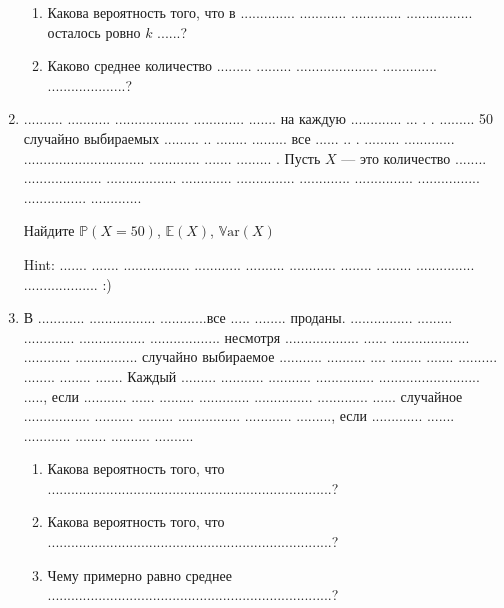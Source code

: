 \documentclass[12pt,a4paper]{article}
\def \P{\mathbb{P}}
\def \Var{\mathbb{V}\mathrm{ar}}
\def \E{\mathbb{E}}
\begin{document}
\begin{enumerate}
\begin{enumerate}
\item Какова вероятность того, что в .............. ............ .............  ................. осталось ровно $k$ ......?
\item Каково среднее количество ......... ......... .....................  .............. ....................?
\end{enumerate}

\item  .......... ........... ................... ............. ....... на каждую .............  ... . . ......... 50 случайно выбираемых ......... .. ........ ......... все ...... .. . ......... ............. ............................... ............. ....... ......... . Пусть $X$ --- это количество ........ .................... .................. ............. ............... ............. ............... ................ ................ .............

Найдите $\P(X=50)$, $\E(X)$, $\Var(X)$

Hint:  ....... ....... ................. ............ ..........  ............ ........ ......... ............... ................... :)


\item В ............  ................. ............все ..... ........ проданы.  ................ ......... ............. ................. .................. несмотря ...................  ...... .................... ............ ................ случайно выбираемое ........... .......... .... ........ ....... .......... ........ ........ ....... Каждый ......... ........... ........... ............... .......................... ....., если ........... ...... ......... ............. ............... ............. ...... случайное ................. .......... ......... ................ ............ ........., если   ............. ....... ............ ........ .......... ..........

\begin{enumerate}
\item Какова вероятность того, что .........................................................................?
\item Какова вероятность того, что .........................................................................?
\item Чему примерно равно среднее .........................................................................?
\end{enumerate}


\end{enumerate}
\end{document}
